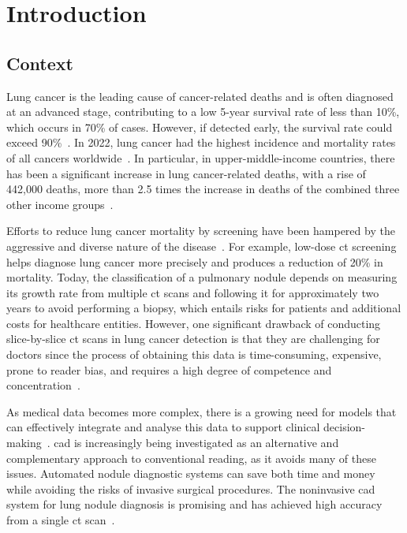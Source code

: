 \chapter{Introduction} \label{chap:intro}


\section{Context} \label{sec:context}

Lung cancer is the leading cause of cancer-related deaths and is often diagnosed at an advanced stage, contributing to a low 5-year survival rate of less than 10\%, which occurs in 70\% of cases. However, if detected early, the survival rate could exceed 90\%~\cite{ning_early_2021}. In 2022, lung cancer had the highest incidence and mortality rates of all cancers worldwide~\cite{international_agency_for_research_on_cancer_trachea_2024}. In particular, in upper-middle-income countries, there has been a significant increase in lung cancer-related deaths, with a rise of 442,000 deaths, more than 2.5 times the increase in deaths of the combined three other income groups~\cite{world_health_organization_top_2024}.

Efforts to reduce lung cancer mortality by screening have been hampered by the aggressive and diverse nature of the disease~\cite{national_lung_screening_trial_research_team_reduced_2011}. For example, low-dose \ac{ct} screening helps diagnose lung cancer more precisely and produces a reduction of 20\% in mortality. Today, the classification of a pulmonary nodule depends on measuring its growth rate from multiple \ac{ct} scans and following it for approximately two years to avoid performing a biopsy, which entails risks for patients and additional costs for healthcare entities. However, one significant drawback of conducting slice-by-slice \ac{ct} scans in lung cancer detection is that they are challenging for doctors since the process of obtaining this data is time-consuming, expensive, prone to reader bias, and requires a high degree of competence and concentration~\cite{shaffie_computer-assisted_2022}.

As medical data becomes more complex, there is a growing need for models that can effectively integrate and analyse this data to support clinical decision-making~\cite{iqbal_fusion_2023}. \ac{cad} is increasingly being investigated as an alternative and complementary approach to conventional reading, as it avoids many of these issues. Automated nodule diagnostic systems can save both time and money while avoiding the risks of invasive surgical procedures. The noninvasive \ac{cad} system for lung nodule diagnosis is promising and has achieved high accuracy from a single \ac{ct} scan~\cite{shaffie_computer-assisted_2022}.

